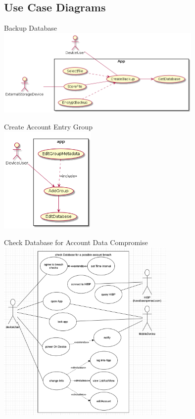 \documentclass[stu]{apa7}
\begin{document}
\normalsize

\pagebreak

\subsection{Use Case Diagrams}

Backup Database \\
\includegraphics[width=0.75\textwidth]{diag/gt/uc1.png}

Create Account Entry Group \\
\includegraphics[width=0.35\textwidth]{diag/gt/uc2.png}

\pagebreak
Check Database for Account Data Compromise \\
\includegraphics[width=0.65\textwidth]{diag/rjm/uc1.png}
\end{document}
